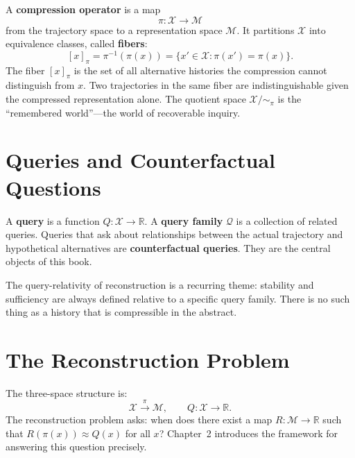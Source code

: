 A \textbf{compression operator} is a map
\[
  \pi : \mathcal{X} \to \mathcal{M}
\]
from the trajectory space to a representation space $\mathcal{M}$. It partitions $\mathcal{X}$ into equivalence classes, called \textbf{fibers}:
\[
  [x]_\pi = \pi^{-1}(\pi(x)) = \{x' \in \mathcal{X} : \pi(x') = \pi(x)\}.
\]
The fiber $[x]_\pi$ is the set of all alternative histories the compression cannot distinguish from $x$. Two trajectories in the same fiber are indistinguishable given the compressed representation alone. The quotient space $\mathcal{X}/{\sim_\pi}$ is the ``remembered world''---the world of recoverable inquiry.

\section{Queries and Counterfactual Questions}

A \textbf{query} is a function $Q : \mathcal{X} \to \mathbb{R}$. A \textbf{query family} $\mathcal{Q}$ is a collection of related queries. Queries that ask about relationships between the actual trajectory and hypothetical alternatives are \textbf{counterfactual queries}. They are the central objects of this book.

The query-relativity of reconstruction is a recurring theme: stability and sufficiency are always defined relative to a specific query family. There is no such thing as a history that is compressible in the abstract.

\section{The Reconstruction Problem}

The three-space structure is:
\[
  \mathcal{X} \xrightarrow{\pi} \mathcal{M}, \qquad Q : \mathcal{X} \to \mathbb{R}.
\]
The reconstruction problem asks: when does there exist a map $R : \mathcal{M} \to \mathbb{R}$ such that $R(\pi(x)) \approx Q(x)$ for all $x$? Chapter~2 introduces the framework for answering this question precisely.
